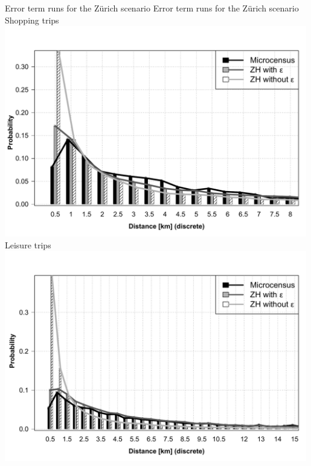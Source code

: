 \createfigure%
{Error term runs for the Zürich scenario}%
{Error term runs for the Zürich scenario}%
{\label{fig:zhLEGO}}%
{%
  \createsubfigure%
  {Shopping trips}%
	{\includegraphics[width=0.99\textwidth,angle=0]{extending/figures/dc/zhShopping.pdf}}%
  {\label{fig:zhShopping}}%
  {}%
   \createsubfigure%
  {Leisure trips}%
  {\includegraphics[width=0.99\textwidth,angle=0]{extending/figures/dc//zhLeisure.pdf}}%
  {\label{fig:zhLeisure}}%
  {}%
}%
{}


